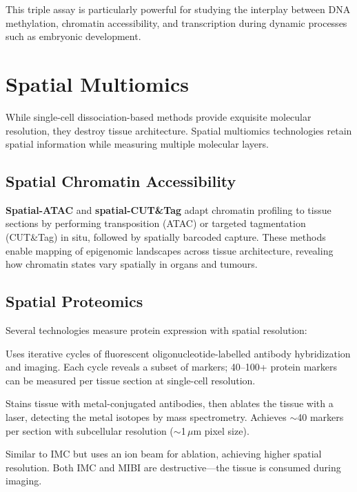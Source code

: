 This triple assay is particularly powerful for studying the interplay between DNA methylation, chromatin accessibility, and transcription during dynamic processes such as embryonic development.


\section{Spatial Multiomics}
\label{sec:multiomics:spatial}

While single-cell dissociation-based methods provide exquisite molecular resolution, they destroy tissue architecture. Spatial multiomics technologies retain spatial information while measuring multiple molecular layers.

\subsection{Spatial Chromatin Accessibility}
\label{subsec:multiomics:spatial-atac}

\textbf{Spatial-ATAC} and \textbf{spatial-CUT\&Tag} adapt chromatin profiling to tissue sections by performing transposition (ATAC) or targeted tagmentation (CUT\&Tag) in situ, followed by spatially barcoded capture. These methods enable mapping of epigenomic landscapes across tissue architecture, revealing how chromatin states vary spatially in organs and tumours.

\subsection{Spatial Proteomics}
\label{subsec:multiomics:spatial-proteomics}

Several technologies measure protein expression with spatial resolution:

\begin{description}[style=nextline, itemsep=3pt]
  \item[CODEX / PhenoCycler (Akoya Biosciences)] Uses iterative cycles of fluorescent oligonucleotide-labelled antibody hybridization and imaging. Each cycle reveals a subset of markers; 40--100+ protein markers can be measured per tissue section at single-cell resolution.

  \item[Imaging Mass Cytometry (IMC; Standard BioTools)] Stains tissue with metal-conjugated antibodies, then ablates the tissue with a laser, detecting the metal isotopes by mass spectrometry. Achieves $\sim$40 markers per section with subcellular resolution ($\sim$1\,$\mu$m pixel size).

  \item[MIBI (Multiplexed Ion Beam Imaging)] Similar to IMC but uses an ion beam for ablation, achieving higher spatial resolution. Both IMC and MIBI are destructive---the tissue is consumed during imaging.
\end{description}

